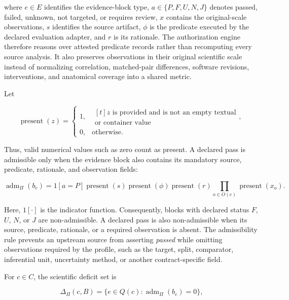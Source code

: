\documentclass[11pt,a4paper]{article}
\begin{document}
where $e\in E$ identifies the evidence-block type,
$a\in\{P,F,U,N,J\}$ denotes passed, failed, unknown, not targeted, or
requires review, $x$ contains the original-scale observations, $s$ identifies
the source artifact, $\phi$ is the predicate executed by the declared
evaluation adapter, and $r$ is its rationale. The authorization engine
therefore reasons over attested predicate records rather than recomputing
every source analysis. It also preserves observations in their original
scientific scale instead of normalizing correlation, matched-pair
differences, software revisions, interventions, and anatomical coverage into
a shared metric.

Let

\begin{equation}
\operatorname{present}(z)=
\begin{cases}
1, & \begin{aligned}[t]z\text{ is provided and is not an empty textual}\\\text{or container value}\end{aligned},\\
0, & \text{otherwise}.
\end{cases}
\label{eq:field-presence}
\end{equation}

Thus, valid numerical values such as zero count as present. A declared pass
is admissible only when the evidence block also contains its mandatory source,
predicate, rationale, and observation fields:

\begin{equation}
\operatorname{adm}_{\Pi}(b_e)=
\mathrm{1}[a=P]\operatorname{present}(s)\operatorname{present}(\phi)
\operatorname{present}(r)
\prod_{o\in O(e)}\operatorname{present}(x_o).
\label{eq:admissibility}
\end{equation}

Here, $\mathrm{1}[\cdot]$ is the indicator function. Consequently, blocks
with declared status $F$, $U$, $N$, or $J$ are non-admissible. A declared
pass is also non-admissible when its source, predicate, rationale, or a
required observation is absent. The admissibility rule prevents an upstream
source from asserting \emph{passed} while omitting observations required by
the profile, such as the target, split, comparator, inferential unit,
uncertainty method, or another contract-specific field.

For $c\in C$, the scientific deficit set is

\begin{equation}
\Delta_{\Pi}(c,B)=
\{e\in Q(c):\operatorname{adm}_{\Pi}(b_e)=0\},
\label{eq:scientific-deficits}
\end{equation}
\end{document}
